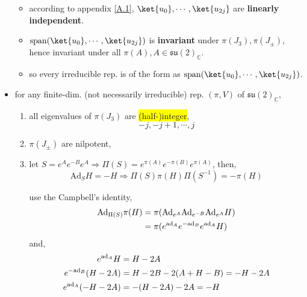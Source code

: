 \begin{itemize}
\begin{tcolorbox}[title=proof:]
		\begin{itemize}
			\item according to appendix \ref{A.1}, $\ket{u_0}, \cdots, \ket{u_{2 j}}$ are \textbf{linearly independent}.
			
			\item $\mathrm{span}(\ket{u_0}, \cdots, \ket{u_{2 j}})$ is \textbf{invariant} under $\pi(J_3), \pi(J_\pm)$, hence invariant under all $\pi(A), A \in \mathfrak{su}(2)_\mathbb{C}$.
			
			\item so every irreducible rep. is of the form as $\mathrm{span}(\ket{u_0}, \cdots, \ket{u_{2 j}})$.
		\end{itemize}
	\end{tcolorbox}
	
	\item for any finite-dim. (not necessarily irreducible) rep. $(\pi, V)$ of $\mathfrak{su}(2)_\mathbb{C}$,
	\begin{enumerate}
		\item all eigenvalues of $\pi(J_3)$ are \colorbox{yellow}{(half-)integer},
		\begin{equation} \label{10.1.6}
			- j, - j + 1, \cdots, j
		\end{equation}
		
		\item $\pi(J_\pm)$ are nilpotent,
		
		\item let $S = e^A e^{- B} e^A \Longrightarrow \Pi(S) = e^{\pi(A)} e^{- \pi(B)} e^{\pi(A)}$, then,
		\begin{equation} \label{10.1.7}
			\mathrm{Ad}_S H = - H \Longrightarrow \Pi(S) \pi(H) \Pi(S^{- 1}) = - \pi(H)
		\end{equation}
		
		\begin{tcolorbox}[title=calculation:]
			use the Campbell's identity,
			\begin{align}
				\mathrm{Ad}_{\Pi(S)} \pi(H) &= \pi(\mathrm{Ad}_{e^A} \mathrm{Ad}_{e^{- B}} \mathrm{Ad}_{e^A} H) \notag \\
				&= \pi(e^{\mathrm{ad}_A} e^{- \mathrm{ad}_B} e^{\mathrm{ad}_A} H)
			\end{align}
			and,
			\begin{align}
				e^{\mathrm{ad}_A} H &= H - 2 A \notag \\
				e^{- \mathrm{ad}_B} (H - 2 A) &= H - 2 B - 2 (A + H - B) = - H - 2 A \notag \\
				e^{\mathrm{ad}_A} (- H - 2 A) &= - (H - 2 A) - 2 A = - H
			\end{align}
			

\end{tcolorbox}
\end{enumerate}
\end{itemize}
